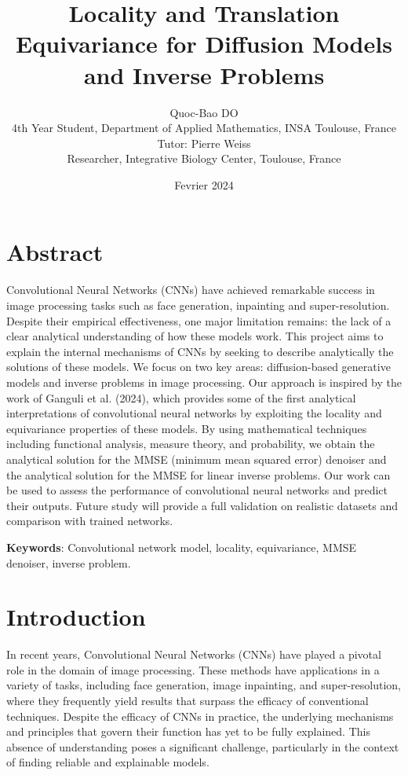 \documentclass[a4paper,10pt]{article}
\title{Locality and Translation Equivariance for Diffusion Models and Inverse Problems}
\author{Quoc-Bao DO \\
4th Year Student, Department of Applied Mathematics, INSA Toulouse, France \\
Tutor: Pierre Weiss \\
Researcher, Integrative Biology Center, Toulouse, France}
\date{Fevrier 2024}
\begin{document}
\maketitle


\newpage
\tableofcontents
\newpage

\section*{Abstract}
Convolutional Neural Networks (CNNs) have achieved remarkable success in image processing tasks such as face generation, inpainting and super-resolution. Despite their empirical effectiveness, one major limitation remains: the lack of a clear analytical understanding of how these models work. This project aims to explain the internal mechanisms of CNNs by seeking to describe analytically the solutions of these models. We focus on two key areas: diffusion-based generative models and inverse problems in image processing. Our approach is inspired by the work of Ganguli et al. (2024), which provides some of the first analytical interpretations of convolutional neural networks by exploiting the locality and equivariance properties of these models. By using mathematical techniques including functional analysis, measure theory, and probability, we obtain the analytical solution for the MMSE (minimum mean squared error) denoiser and the analytical solution for the MMSE for linear inverse problems. Our work can be used to assess the performance of convolutional neural networks and predict their outputs. Future study will provide a full validation on realistic datasets and comparison with trained networks.

\textbf{Keywords}: Convolutional network model, locality, equivariance, MMSE denoiser, inverse problem.

\section{Introduction}

In recent years, Convolutional Neural Networks (CNNs) have played a pivotal role in the domain of image processing. These methods have applications in a variety of tasks, including face generation, image inpainting, and super-resolution, where they frequently yield results that surpass the efficacy of conventional techniques. Despite the efficacy of CNNs in practice, the underlying mechanisms and principles that govern their function has yet to be fully explained. This absence of understanding poses a significant challenge, particularly in the context of finding reliable and explainable models.
\end{document}
